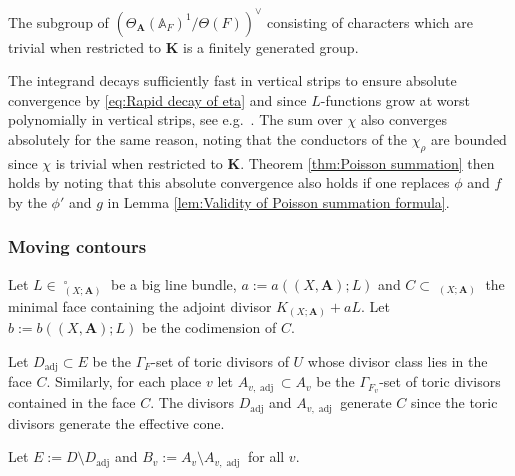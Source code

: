 \documentclass[a4paper,11pt,reqno]{amsart}
\newcommand{\A}{\mathbb{A}}
\DeclareMathOperator{\Eff}{\overline{Eff}}
\DeclareMathOperator{\adj}{adj}
\theoremstyle{definition}
\begin{document}
The subgroup of $(\Theta_{\mathbf{A}}(\A_F)^1/\Theta(F))^{\vee}$ consisting of characters which are trivial when restricted to $\mathbf{K}$ is a finitely generated group.

The integrand decays sufficiently fast in vertical strips to ensure absolute convergence by \eqref{eq:Rapid decay of eta} and since $L$-functions grow at worst polynomially in vertical strips, see e.g.~\cite[Lemma~3.1]{Loughran2018Number}. The sum over $\chi$ also converges absolutely for the same reason, noting that the conductors of the $\chi_{\rho}$ are bounded since $\chi$ is trivial when restricted to $\mathbf{K}$. Theorem \ref{thm:Poisson summation} then holds by noting that this absolute convergence also holds if one replaces $\phi$ and $f$ by the $\phi'$ and $g$ in Lemma \ref{lem:Validity of Poisson summation formula}.

\subsubsection{Moving contours}
Let $L \in \Eff_{(X; \mathbf{A})}^{\circ}$ be a big line bundle, $a := a((X, \mathbf{A}); L)$ and $C \subset \Eff_{(X; \mathbf{A})}$ the minimal face containing the adjoint divisor $K_{(X; \mathbf{A})} + aL$. Let $b := b((X, \mathbf{A}); L)$ be the codimension of $C$.

Let $D_{\adj} \subset E$ be the $\Gamma_F$-set of toric divisors of $U$ whose divisor class lies in the face $C$. Similarly, for each place $v$ let $A_{v, \adj} \subset A_v$ be the $\Gamma_{F_v}$-set of toric divisors contained in the face $C$. The divisors $D_{\adj}$ and $A_{v, \adj}$ generate $C$ since the toric divisors generate the effective cone.

Let $E := D \setminus D_{\adj}$ and $B_v := A_v \setminus A_{v, \adj}$ for all $v$.
\end{document}
